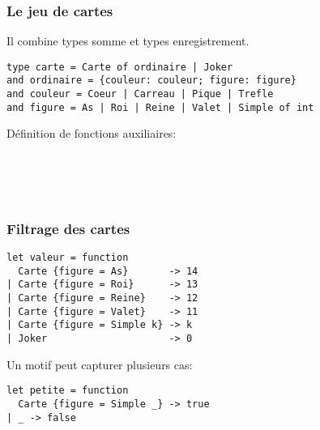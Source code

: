 %
\begin{frame}[containsverbatim]
\frametitle{Le jeu de cartes}

Il combine types somme et types enregistrement.

{\small
\begin{verbatim}
type carte = Carte of ordinaire | Joker
and ordinaire = {couleur: couleur; figure: figure}
and couleur = Coeur | Carreau | Pique | Trefle
and figure = As | Roi | Reine | Valet | Simple of int
\end{verbatim}
}

Définition de fonctions auxiliaires:

\\
\\
\\
 
\end{frame}

%
\begin{frame}[containsverbatim]
\frametitle{Filtrage des cartes}

{\small
\begin{verbatim}
let valeur = function
  Carte {figure = As}       -> 14
| Carte {figure = Roi}      -> 13
| Carte {figure = Reine}    -> 12
| Carte {figure = Valet}    -> 11
| Carte {figure = Simple k} -> k
| Joker                     -> 0
\end{verbatim}
}

Un motif peut capturer plusieurs cas:

{\small
\begin{verbatim}
let petite = function
  Carte {figure = Simple _} -> true
| _ -> false
\end{verbatim}
}

\end{frame}

